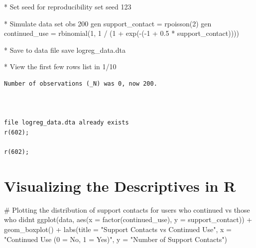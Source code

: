 \documentclass[
  letterpaper,
  DIV=11,
  numbers=noendperiod]{scrreprt}
\newenvironment{Shaded}{\begin{snugshade}}{\end{snugshade}}
\newcommand{\AttributeTok}[1]{\textcolor[rgb]{0.40,0.45,0.13}{#1}}
\newcommand{\BaseNTok}[1]{\textcolor[rgb]{0.68,0.00,0.00}{#1}}
\newcommand{\CommentTok}[1]{\textcolor[rgb]{0.37,0.37,0.37}{#1}}
\newcommand{\DecValTok}[1]{\textcolor[rgb]{0.68,0.00,0.00}{#1}}
\newcommand{\FunctionTok}[1]{\textcolor[rgb]{0.28,0.35,0.67}{#1}}
\newcommand{\KeywordTok}[1]{\textcolor[rgb]{0.00,0.23,0.31}{#1}}
\newcommand{\NormalTok}[1]{\textcolor[rgb]{0.00,0.23,0.31}{#1}}
\newcommand{\OtherTok}[1]{\textcolor[rgb]{0.00,0.23,0.31}{#1}}
\newcommand{\SpecialCharTok}[1]{\textcolor[rgb]{0.37,0.37,0.37}{#1}}
\newcommand{\StringTok}[1]{\textcolor[rgb]{0.13,0.47,0.30}{#1}}
\begin{document}
\begin{Shaded}
\begin{Highlighting}[]
\NormalTok{* Set }\DecValTok{seed} \KeywordTok{for}\NormalTok{ reproducibility}
\KeywordTok{set} \DecValTok{seed}\NormalTok{ 123}

\NormalTok{* Simulate }\KeywordTok{data}
\KeywordTok{set} \KeywordTok{obs}\NormalTok{ 200}
\KeywordTok{gen}\NormalTok{ support\_contact = rpoisson(2)}
\KeywordTok{gen}\NormalTok{ continued\_use = rbinomial(1, 1 / (1 + }\FunctionTok{exp}\NormalTok{({-}({-}1 + 0.5 * support\_contact))))}

\NormalTok{* Save to }\KeywordTok{data}\NormalTok{ file}
\KeywordTok{save}\NormalTok{ logreg\_data.dta}

\NormalTok{* View the first few }\BaseNTok{rows}
\OtherTok{list} \KeywordTok{in}\NormalTok{ 1/10}
\end{Highlighting}
\end{Shaded}

\begin{verbatim}
Number of observations (_N) was 0, now 200.



file logreg_data.dta already exists
r(602);

r(602);
\end{verbatim}

\section{Visualizing the Descriptives in
R}\label{visualizing-the-descriptives-in-r-1}

\begin{Shaded}
\begin{Highlighting}[]
\CommentTok{\# Plotting the distribution of support contacts for users who continued vs those who didn\textquotesingle{}t}
\FunctionTok{ggplot}\NormalTok{(data, }\FunctionTok{aes}\NormalTok{(}\AttributeTok{x =} \FunctionTok{factor}\NormalTok{(continued\_use), }\AttributeTok{y =}\NormalTok{ support\_contact)) }\SpecialCharTok{+}
  \FunctionTok{geom\_boxplot}\NormalTok{() }\SpecialCharTok{+}
  \FunctionTok{labs}\NormalTok{(}\AttributeTok{title =} \StringTok{"Support Contacts vs Continued Use"}\NormalTok{,}
       \AttributeTok{x =} \StringTok{"Continued Use (0 = No, 1 = Yes)"}\NormalTok{,}
       \AttributeTok{y =} \StringTok{"Number of Support Contacts"}\NormalTok{)}
\end{Highlighting}
\end{Shaded}
\end{document}
